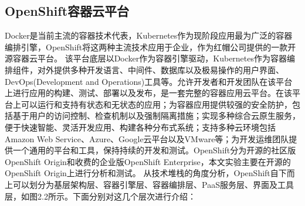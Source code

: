 \subsection{OpenShift容器云平台}
\label{chap1:sample:table} 
Docker是当前主流的容器技术代表，Kubernetes作为现阶段应用最为广泛的容器编排引擎，OpenShift将这两种主流技术应用于企业，作为红帽公司提供的一款开源容器云平台。
该平台底层以Docker作为容器引擎驱动，Kubernetes作为容器编排组件，对外提供多种开发语言、中间件、数据库以及极易操作的用户界面、DevOps(Development and Operations)工具等。允许开发者和开发团队在该平台上进行应用的构建、测试、部署以及发布，是一套完整的容器应用云平台。在该平台上可以运行和支持有状态和无状态的应用；为容器应用提供较强的安全防护，包括基于用户的访问控制、检查机制以及强制隔离措施；实现多种综合云原生服务，便于快速智能、灵活开发应用、构建各种分布式系统；支持多种云环境包括Amazon Web Service、Azure、Google云平台以及VMware等；为开发运维团队提供一个通用的平台和工具，保持持续的开发和测试。OpenShift分为开源的社区版OpenShift Origin和收费的企业版OpenShift Enterprise，本文实验主要在开源的OpenShift Origin上进行分析和测试。
从技术堆栈的角度分析，OpenShift自下而上可以划分为基层架构层、容器引擎层、容器编排层、PaaS服务层、界面及工具层，如图2.2所示。下面分别对这几个层次进行介绍：
